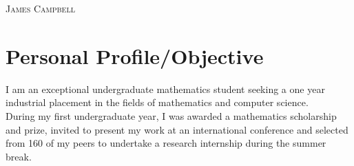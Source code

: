 \documentclass[a4paper]{article}
\begin{document}
\pagestyle{empty} %
\begin{multicols}{2}

\raggedright{\textsc{\Huge{James Campbell}}}\\
\columnbreak
{}

\end{multicols}
\section{Personal Profile/Objective}
I am an exceptional undergraduate mathematics student seeking a one year industrial placement in the fields of mathematics and computer science.
\\

During my first undergraduate year, I was awarded a mathematics scholarship and prize, invited to present my work at an international conference and selected from 160 of my peers to undertake a research internship during the summer break.
\end{document}
